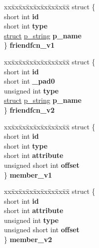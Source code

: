 \begin{DoxyCompactItemize}
\begin{tabbing}
\end{tabbing}\item 
\mbox{\label{unioncodeview__fieldtype_a120baebf2773c5f91209ad64588c42ea}} 
\begin{tabbing}
xx\=xx\=xx\=xx\=xx\=xx\=xx\=xx\=xx\=\kill
struct \{\\
\>short int {\bfseries id}\\
\>short int {\bfseries type}\\
\>\hyperlink{interfacestruct}{struct} \hyperlink{structp__string}{p\_string} {\bfseries p\_name}\\
\} {\bfseries friendfcn\_v1}\\

\end{tabbing}\item 
\mbox{\label{unioncodeview__fieldtype_ad2a8943a68c901a97a23b1115c14c65a}} 
\begin{tabbing}
xx\=xx\=xx\=xx\=xx\=xx\=xx\=xx\=xx\=\kill
struct \{\\
\>short int {\bfseries id}\\
\>short int {\bfseries \_pad0}\\
\>unsigned int {\bfseries type}\\
\>\hyperlink{interfacestruct}{struct} \hyperlink{structp__string}{p\_string} {\bfseries p\_name}\\
\} {\bfseries friendfcn\_v2}\\

\end{tabbing}\item 
\mbox{\label{unioncodeview__fieldtype_a7e3d6e0b13485cb12298f867532b0e61}} 
\begin{tabbing}
xx\=xx\=xx\=xx\=xx\=xx\=xx\=xx\=xx\=\kill
struct \{\\
\>short int {\bfseries id}\\
\>short int {\bfseries type}\\
\>short int {\bfseries attribute}\\
\>unsigned short int {\bfseries offset}\\
\} {\bfseries member\_v1}\\

\end{tabbing}\item 
\mbox{\label{unioncodeview__fieldtype_a5fd1c1360698ecbe1929957518e7759d}} 
\begin{tabbing}
xx\=xx\=xx\=xx\=xx\=xx\=xx\=xx\=xx\=\kill
struct \{\\
\>short int {\bfseries id}\\
\>short int {\bfseries attribute}\\
\>unsigned int {\bfseries type}\\
\>unsigned short int {\bfseries offset}\\
\} {\bfseries member\_v2}\\


\end{tabbing}
\end{DoxyCompactItemize}
